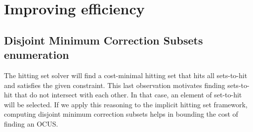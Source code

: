 \documentclass[twoside,11pt]{article}
\begin{document}
\section{Improving efficiency}

\subsection{Disjoint Minimum Correction Subsets enumeration}

The hitting set solver will find a cost-minimal hitting set that hits all sets-to-hit and satisfies the given constraint. This last observation motivates finding sets-to-hit that do not intersect with each other. In that case, an element of set-to-hit will be selected. If we apply this reasoning to the implicit hitting set framework, computing disjoint minimum correction subsets helps in bounding the cost of finding an OCUS.
\end{document}
